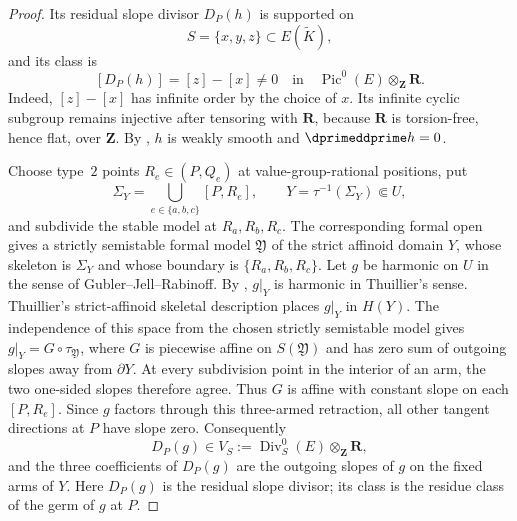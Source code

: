 \begin{proof}
Its residual slope divisor $D_P(h)$ is supported on
\begin{equation}
\label{eq:ch19-harmonic-reg-support}
                         S=\{x,y,z\}\subset E(\widetilde K),
\end{equation}
and its class is
\begin{equation}
\label{eq:ch19-harmonic-reg-nonzero-class}
 [D_P(h)]=[z]-[x]\neq0
       \quad\text{in}\quad
 \operatorname{Pic}^0(E)\otimes_{\mathbf Z}\mathbf R.
\end{equation}
Indeed, $[z]-[x]$ has infinite order by the choice of $x$.  Its infinite
cyclic subgroup remains injective after tensoring with $\mathbf R$, because
$\mathbf R$ is torsion-free, hence flat, over $\mathbf Z$.  By
\cite[Proposition~10.17]{GJR26}, $h$ is weakly smooth and
$\dprimeddprime h=0$.

Choose type~$2$ points $R_e\in(P,Q_e)$ at value-group-rational positions, put
\[
              \Sigma_Y=\bigcup_{e\in\{a,b,c\}}[P,R_e],
              \qquad Y=\tau^{-1}(\Sigma_Y)\Subset U,
\]
and subdivide the stable model at $R_a,R_b,R_c$.  The corresponding formal
open gives a strictly semistable formal model $\mathfrak Y$ of the strict
affinoid domain $Y$, whose skeleton is $\Sigma_Y$ and whose boundary is
$\{R_a,R_b,R_c\}$.  Let $g$ be harmonic on $U$ in the sense of
Gubler--Jell--Rabinoff.  By \cite[Proposition~15.7]{GJR26}, $g|_Y$ is
harmonic in Thuillier's sense.  Thuillier's strict-affinoid skeletal
description \cite[Definitions~2.3.1, 2.3.12, and 2.3.16]{Thu05} places
$g|_Y$ in $H(Y)$.  The independence of this space from the chosen strictly
semistable model \cite[Proposition~2.3.3]{Thu05} gives
$g|_Y=G\circ\tau_{\mathfrak Y}$, where $G$ is piecewise affine on
$S(\mathfrak Y)$ and has zero sum of outgoing slopes away from $\partial Y$.
At every subdivision point in the interior of an arm, the two one-sided
slopes therefore agree.  Thus $G$ is affine with constant slope on each
$[P,R_e]$.  Since $g$ factors through this three-armed retraction, all other
tangent directions at $P$ have slope zero.  Consequently
\begin{equation}
\label{eq:ch19-harmonic-reg-fixed-support}
       D_P(g)\in
       V_S:=\operatorname{Div}^0_S(E)\otimes_{\mathbf Z}\mathbf R,
\end{equation}
and the three coefficients of $D_P(g)$ are the outgoing slopes of $g$ on the
fixed arms of $Y$.  Here $D_P(g)$ is the residual slope divisor; its class is
the residue class of the germ of $g$ at $P$.


\end{proof}
